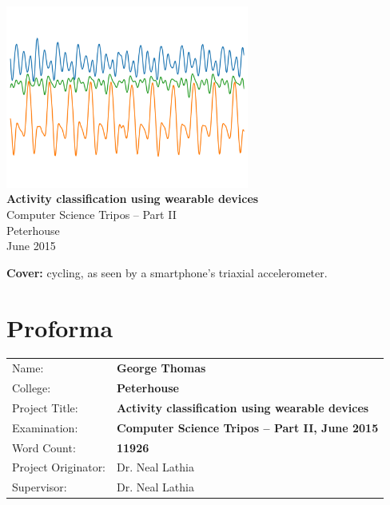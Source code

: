 \documentclass[12pt,a4paper,twoside,openright]{report}
\begin{document}


\pagestyle{empty}


\vspace*{35mm}
\begin{center}
\includegraphics[width=0.6\textwidth]{coverimage}
\\
\Large
\textbf{Activity classification using wearable devices} \\[5mm]
\large
Computer Science Tripos -- Part II \\[5mm]
Peterhouse \\[5mm]
June 2015
\end{center}

\newpage
\par\vspace*{\fill}
\textbf{Cover:} cycling, as seen by a smartphone's triaxial accelerometer.
\clearpage
{}
\chapter*{Proforma}

{
\begin{tabular}{ll}
Name:               & \bf George Thomas                       \\
College:            & \bf Peterhouse                     \\
Project Title:      & \bf Activity classification using wearable devices \\
Examination:        & \bf Computer Science Tripos -- Part II, June 2015  \\
Word Count:         & \bf 11926 \\
Project Originator: & Dr. Neal Lathia                    \\
Supervisor:         & Dr. Neal Lathia                    \\
\end{tabular}
}
\end{document}
